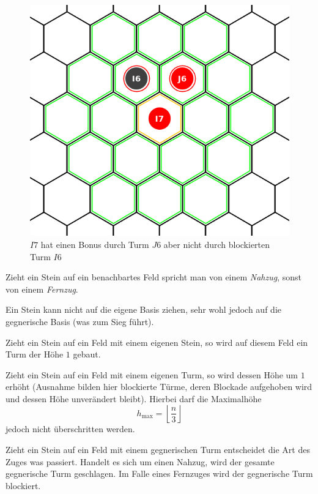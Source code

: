 \begin{figure}[ht]
\begin{center}
\includegraphics[scale=0.3]{graphic/range-blockedbonus.png}
\end{center}
\caption*{$I7$ hat einen Bonus durch Turm $J6$ aber nicht durch blockierten Turm $I6$}
\end{figure}

Zieht ein Stein auf ein benachbartes Feld spricht man von einem \emph{Nahzug}, sonst von einem \emph{Fernzug}.

Ein Stein kann nicht auf die eigene Basis ziehen, sehr wohl jedoch auf die gegnerische Basis (was zum Sieg führt).

Zieht ein Stein auf ein Feld mit einem eigenen Stein, so wird auf diesem Feld ein Turm der Höhe $1$ gebaut.

Zieht ein Stein auf ein Feld mit einem eigenen Turm, so wird dessen Höhe um $1$ erhöht (Ausnahme bilden hier blockierte Türme, deren Blockade aufgehoben wird und dessen Höhe unverändert bleibt). Hierbei darf die Maximalhöhe \[h_\text{max} = \left\lfloor \frac{n}{3}\right\rfloor\] jedoch nicht überschritten werden.

Zieht ein Stein auf ein Feld mit einem gegnerischen Turm entscheidet die Art des Zuges was passiert. Handelt es sich um einen Nahzug, wird der gesamte gegnerische Turm geschlagen. Im Falle eines Fernzuges wird der gegnerische Turm blockiert.

